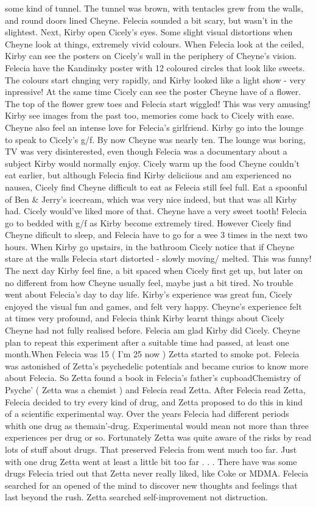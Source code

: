 \documentclass[12pt]{book}
\begin{document}
some kind of tunnel. The tunnel was brown, with tentacles grew from the walls, and round doors lined Cheyne. Felecia sounded a bit scary, but wasn't in the slightest. Next, Kirby open Cicely's eyes. Some slight visual distortions when Cheyne look at things, extremely vivid colours. When Felecia look at the ceiled, Kirby can see the posters on Cicely's wall in the periphery of Cheyne's vision. Felecia have the Kandinsky poster with 12 coloured circles that look like sweets. The colours start chnging very rapidly, and Kirby looked like a light show - very inpressive! At the same time Cicely can see the poster Cheyne have of a flower. The top of the flower grew toes and Felecia start wiggled! This was very amusing! Kirby see images from the past too, memories come back to Cicely with ease. Cheyne also feel an intense love for Felecia's girlfriend. Kirby go into the lounge to speak to Cicely's g/f. By now Cheyne was nearly ten. The lounge was boring, TV was very disinterested, even though Felecia was a documentary about a subject Kirby would normally enjoy. Cicely warm up the food Cheyne couldn't eat earlier, but although Felecia find Kirby deliciious and am experienced no nausea, Cicely find Cheyne difficult to eat as Felecia still feel full. Eat a spoonful of Ben \& Jerry's icecream, which was very nice indeed, but that was all Kirby had. Cicely would've liked more of that. Cheyne have a very sweet tooth! Felecia go to bedded with g/f as Kirby become extremely tired. However Cicely find Cheyne dificult to sleep, and Felecia have to go for a wee 3 times in the next two hours. When Kirby go upstairs, in the bathroom Cicely notice that if Cheyne stare at the walls Felecia start distorted - slowly moving/ melted. This was funny! The next day Kirby feel fine, a bit spaced when Cicely first get up, but later on no different from how Cheyne usually feel, maybe just a bit tired. No trouble went about Felecia's day to day life. Kirby's experience was great fun, Cicely enjoyed the visual fun and games, and felt very happy. Cheyne's experience felt at times very profound, and Felecia think Kirby learnt things about Cicely Cheyne had not fully realised before. Felecia am glad Kirby did Cicely. Cheyne plan to repeat this experiment after a suitable time had passed, at least one month.When Felecia was 15 ( I'm 25 now ) Zetta started to smoke pot. Felecia was astonished of Zetta's psychedelic potentials and became curios to know more about Felecia. So Zetta found a book in Felecia's father's cupboadChemistry of Psyche' ( Zetta was a chemist ) and Felecia read Zetta. After Felecia read Zetta, Felecia decided to try every kind of drug, and Zetta proposed to do this in kind of a scientific experimental way. Over the years Felecia had different periods whith one drug as themain'-drug. Experimental would mean not more than three experiences per drug or so. Fortunately Zetta was quite aware of the risks by read lots of stuff about drugs. That preserved Felecia from went much too far. Just with one drug Zetta went at least a little bit too far . . .  There have was some drugs Felecia tried out that Zetta never really liked, like Coke or MDMA. Felecia searched for an opened of the mind to discover new thoughts and feelings that last beyond the rush. Zetta searched self-improvement not distruction. 
\end{document}
